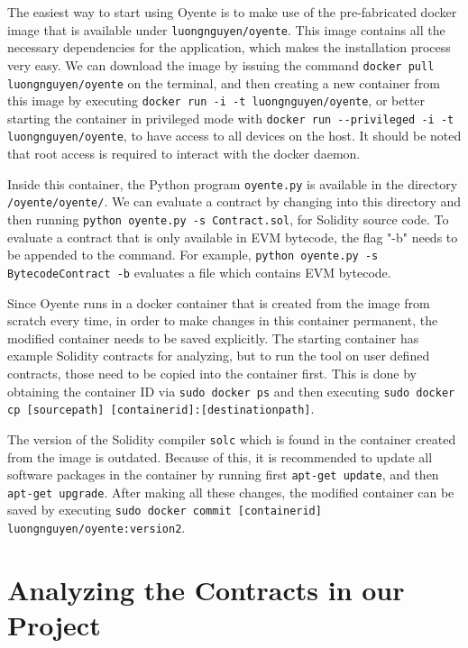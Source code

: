 The easiest way to start using Oyente is to make use of the pre-fabricated docker image that is available under \texttt{luongnguyen/oyente}. This image contains all the necessary dependencies for the application, which makes the installation process very easy. We can download the image by issuing the command \texttt{docker pull luongnguyen/oyente} on the terminal, and then creating a new container from this image by executing \texttt{docker run -i -t luongnguyen/oyente}, or better starting the container in privileged mode with \texttt{docker run -{}-privileged -i -t luongnguyen/oyente}, to have access to all devices on the host. It should be noted that root access is required to interact with the docker daemon.

Inside this container, the Python program \texttt{oyente.py} is available in the directory \texttt{/oyente/oyente/}. We can evaluate a contract by changing into this directory and then running \texttt{python oyente.py -s Contract.sol}, for Solidity source code. To evaluate a contract that is only available in EVM bytecode, the flag "-b" needs to be appended to the command. For example, \texttt{python oyente.py -s BytecodeContract -b} evaluates a file which contains EVM bytecode.

Since Oyente runs in a docker container that is created from the image from scratch every time, in order to make changes in this container permanent, the modified container needs to be saved explicitly. The starting container has example Solidity contracts for analyzing, but to run the tool on user defined contracts, those need to be copied into the container first. This is done by obtaining the container ID via \texttt{sudo docker ps} and then executing \texttt{sudo docker cp [source\textunderscore path] [container\textunderscore id]:[destination\textunderscore path]}.

The version of the Solidity compiler \texttt{solc} which is found in the container created from the image is outdated. Because of this, it is recommended to update all software packages in the container by running first \texttt{apt-get update}, and then \texttt{apt-get upgrade}. After making all these changes, the modified container can be saved by executing \texttt{sudo docker commit [container\textunderscore id] luongnguyen/oyente:version2}.

\section*{Analyzing the Contracts in our Project}

